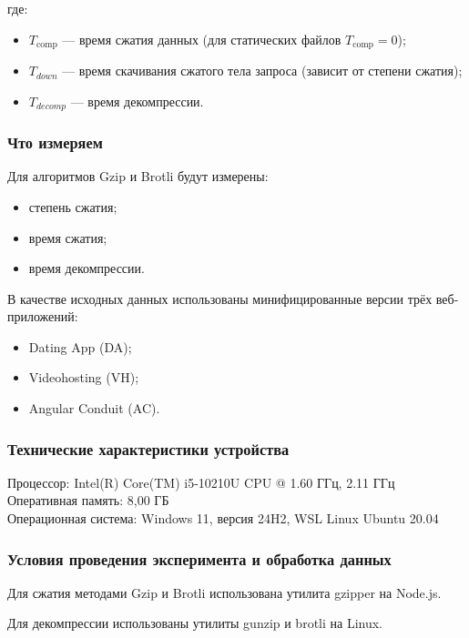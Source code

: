 \documentclass[12pt]{article}
\begin{document}
где:
\begin{itemize}
    \item $T_{\text{comp}}$ — время сжатия данных (для статических файлов $T_{\text{comp}} = 0$);
    \item $T_{down}$ — время скачивания сжатого тела запроса (зависит от степени сжатия);
    \item $T_{decomp}$ — время декомпрессии.
\end{itemize}

\subsubsection{Что измеряем}

Для алгоритмов Gzip и Brotli будут измерены:
\begin{itemize}[label=-]
    \item степень сжатия;
    \item время сжатия;
    \item время декомпрессии.
\end{itemize}

В качестве исходных данных использованы минифицированные версии трёх веб-приложений:
\begin{itemize}[label=-]
    \item Dating App (DA);
    \item Videohosting (VH);
    \item Angular Conduit (AC).
\end{itemize}

\subsubsection{Технические характеристики устройства}

Процессор: Intel(R) Core(TM) i5-10210U CPU @ 1.60 ГГц, 2.11 ГГц\\
Оперативная память: 8,00 ГБ\\
Операционная система: Windows 11, версия 24H2, WSL Linux Ubuntu 20.04

\subsubsection{Условия проведения эксперимента и обработка данных}

Для сжатия методами Gzip и Brotli использована утилита gzipper \cite{gzipper} на Node.js.

Для декомпрессии использованы утилиты gunzip \cite{gunzip} и brotli на Linux.
\end{document}

